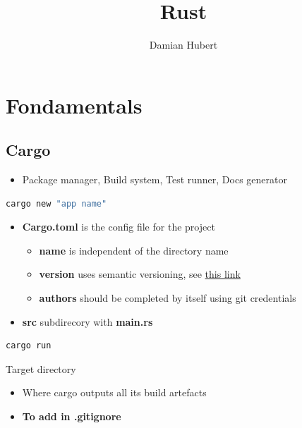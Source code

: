 \documentclass{report}
\author{Damian Hubert}
\title{Rust}
\begin{document}
\maketitle
\tableofcontents


\chapter{Fondamentals}

\begin{multicols*}{2}


\section{Cargo}
\begin{itemize}
	\item Package manager, Build system, Test runner, Docs generator
\end{itemize}

\begin{tcolorbox}[title=Creating Project,colback=backcolour,size=small,left=4mm]
\begin{lstlisting}[language=bash]
cargo new "app name"
\end{lstlisting}
\end{tcolorbox}

\begin{itemize}
	\item \textbf{Cargo.toml} is the config file for the project
		\begin{itemize}
			\item \textbf{name} is independent of the directory name 
			\item \textbf{version} uses semantic versioning, see \href{https://semver.org}{this link} 
			\item \textbf{authors} should be completed by itself using git credentials 
		\end{itemize}
	\item \textbf{src} subdirecory with \textbf{main.rs} 
\end{itemize}

\begin{tcolorbox}[title=Running a Program,colback=backcolour,size=small,left=4mm]
\begin{lstlisting}[language=bash]
cargo run
\end{lstlisting}
\end{tcolorbox}

Target directory
\begin{itemize}
	\item Where cargo outputs all its build artefacts 
	\item \textbf{To add in .gitignore} 
\end{itemize}


\end{multicols*}
\end{document}
